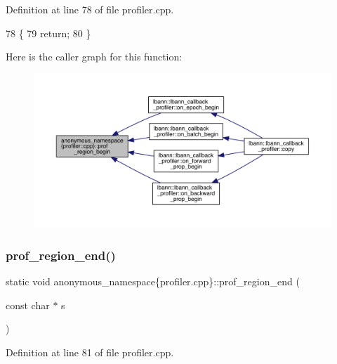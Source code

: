 Definition at line 78 of file profiler.\+cpp.


\begin{DoxyCode}
78                                                     \{
79   \textcolor{keywordflow}{return};
80 \}
\end{DoxyCode}
Here is the caller graph for this function\+:\nopagebreak
\begin{figure}[H]
\begin{center}
\leavevmode
\includegraphics[width=350pt]{namespaceanonymous__namespace_02profiler_8cpp_03_ad2ea0278cd1f25dc30ddd76194ace64b_icgraph}
\end{center}
\end{figure}
\mbox{\label{namespaceanonymous__namespace_02profiler_8cpp_03_a7984c26fb186307873a2f83f91715a99}} 
\subsubsection{\texorpdfstring{prof\+\_\+region\+\_\+end()}{prof\_region\_end()}}
{\footnotesize\ttfamily static void anonymous\+\_\+namespace\{profiler.\+cpp\}\+::prof\+\_\+region\+\_\+end (\begin{DoxyParamCaption}\item[{const char $\ast$}]{s }\end{DoxyParamCaption})\hspace{0.3cm}{\ttfamily [static]}}



Definition at line 81 of file profiler.\+cpp.



